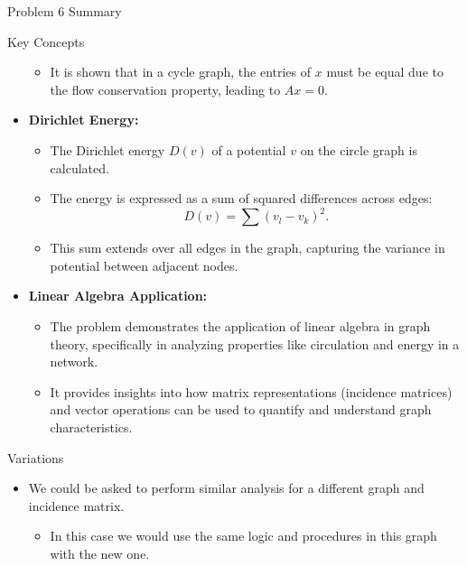 \begin{summary}{Problem 6 Summary}
\begin{statement}{Key Concepts}
\begin{itemize}
\begin{itemize}
                \item It is shown that in a cycle graph, the entries of \( x \) must be equal due to the flow conservation property, leading to \( Ax = 0 \).
            \end{itemize}
            \item \textbf{Dirichlet Energy:}
            \begin{itemize}
                \item The Dirichlet energy \( D(v) \) of a potential \( v \) on the circle graph is calculated.
                \item The energy is expressed as a sum of squared differences across edges:
                \begin{equation*}
                    D(v) = \sum (v_l - v_k)^2.
                \end{equation*}
                \item This sum extends over all edges in the graph, capturing the variance in potential between adjacent nodes.
            \end{itemize}
            \item \textbf{Linear Algebra Application:}
            \begin{itemize}
                \item The problem demonstrates the application of linear algebra in graph theory, specifically in analyzing properties like circulation and energy in a network.
                \item It provides insights into how matrix representations (incidence matrices) and vector operations can be used to quantify and understand graph characteristics.
            \end{itemize}
        \end{itemize}
    \end{statement}
    \begin{statement}{Variations}
        \begin{itemize}
            \item We could be asked to perform similar analysis for a different graph and incidence matrix.
            \begin{itemize}
                \item In this case we would use the same logic and procedures in this graph with the new one.
            \end{itemize}
        \end{itemize}
    \end{statement}
\end{summary}